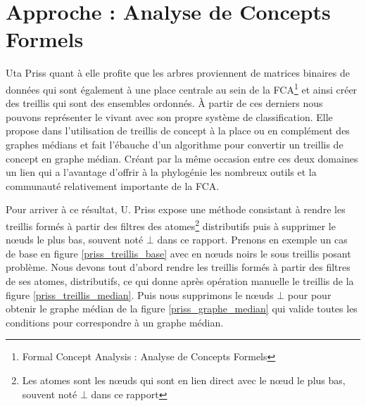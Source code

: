 \section{Approche : Analyse de Concepts Formels}

Uta Priss quant à elle profite que les arbres proviennent de matrices binaires de données qui sont également à une place centrale au sein de la FCA\footnote{Formal Concept Analysis : Analyse de Concepts Formels} et ainsi créer des treillis qui sont des ensembles ordonnés. À partir de ces derniers nous pouvons représenter le vivant avec son propre système de classification. Elle propose dans \cite{MedianConceptLattices} l'utilisation de treillis de concept à la place ou en complément des graphes médians et fait l'ébauche d'un algorithme pour convertir un treillis de concept en graphe médian. Créant par la même occasion entre ces deux domaines un lien qui a l'avantage d'offrir à la phylogénie les nombreux outils et la communauté relativement importante de la FCA.

\bigbreak

Pour arriver à ce résultat, U. Priss expose une méthode consistant à rendre les treillis formés à partir des filtres des atomes\footnote{Les atomes sont les n\oe uds qui sont en lien direct avec le n\oe ud le plus bas, souvent noté $\bot$ dans ce rapport} distributifs puis à supprimer le n\oe uds le plus bas, souvent noté $\bot$ dans ce rapport. Prenons en exemple un cas de base en figure \ref{priss_treillis_base} avec en n\oe uds noirs le sous treillis posant problème. Nous devons tout d'abord rendre les treillis formés à partir des filtres de ses atomes, distributifs, ce qui donne après opération manuelle le treillis de la figure \ref{priss_treillis_median}. Puis nous supprimons le n\oe uds $\bot$ pour pour obtenir le graphe médian de la figure \ref{priss_graphe_median} qui valide toutes les conditions pour correspondre à un graphe médian.

